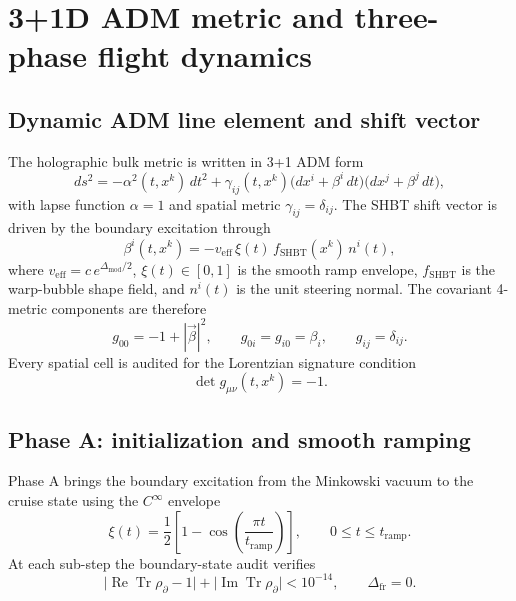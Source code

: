 \section{3+1D ADM metric and three-phase flight dynamics}\label{sec:flight-phases}

\subsection{Dynamic ADM line element and shift vector}

The holographic bulk metric is written in 3+1 ADM form
\begin{equation}
  ds^2
  =
  -\alpha^2(t,x^k)\,dt^2
  +
  \gamma_{ij}(t,x^k)\bigl(dx^i+\beta^i\,dt\bigr)\bigl(dx^j+\beta^j\,dt\bigr),
  \label{eq:adm-line-element}
\end{equation}
with lapse function $\alpha=1$ and spatial metric $\gamma_{ij}=\delta_{ij}$.
The SHBT shift vector is driven by the boundary excitation through
\begin{equation}
  \beta^i(t,x^k)
  =
  -v_{\mathrm{eff}}\,\xi(t)\,f_{\mathrm{SHBT}}(x^k)\,n^i(t),
  \label{eq:adm-shift-vector}
\end{equation}
where $v_{\mathrm{eff}}=c\,e^{\Delta_{\mathrm{mod}}/2}$,
$\xi(t)\in[0,1]$ is the smooth ramp envelope, $f_{\mathrm{SHBT}}$ is the
warp-bubble shape field, and $n^i(t)$ is the unit steering normal.
The covariant 4-metric components are therefore
\begin{equation}
  g_{00}=-1+|\vec\beta|^2,
  \qquad
  g_{0i}=g_{i0}=\beta_i,
  \qquad
  g_{ij}=\delta_{ij}.
  \label{eq:adm-covariant-metric}
\end{equation}
Every spatial cell is audited for the Lorentzian signature condition
\begin{equation}
  \det g_{\mu\nu}(t,x^k)=-1.
  \label{eq:adm-determinant-condition}
\end{equation}

\subsection{Phase A: initialization and smooth ramping}

Phase A brings the boundary excitation from the Minkowski vacuum to the
cruise state using the $C^\infty$ envelope
\begin{equation}
  \xi(t)
  =
  \frac{1}{2}\left[1-\cos\!\left(\frac{\pi t}{t_{\mathrm{ramp}}}\right)\right],
  \qquad
  0\le t\le t_{\mathrm{ramp}}.
  \label{eq:phase-a-ramp}
\end{equation}
At each sub-step the boundary-state audit verifies
\begin{equation}
  \bigl|\operatorname{Re}\operatorname{Tr}\rho_\partial-1\bigr|
  +
  \bigl|\operatorname{Im}\operatorname{Tr}\rho_\partial\bigr|
  <10^{-14},
  \qquad
  \Delta_{\mathrm{fr}}=0.
  \label{eq:phase-a-boundary-audit}
\end{equation}

